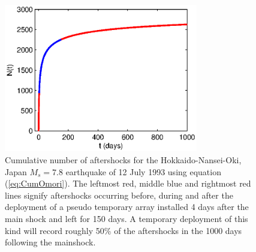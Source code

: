 \documentclass[extra, onecolumn, doublespacing]{gji}
\begin{document}
\begin{figure}
\noindent\includegraphics[width = 20pc]{Figure12_c.eps}
\caption{Cumulative number of aftershocks for the
Hokkaido-Nansei-Oki, Japan $M_s=7.8$ earthquake of 12 July 1993
using equation (\ref{eq:CumOmori}). The leftmost red, middle blue
and rightmost red lines signify aftershocks occurring before, during
and after the deployment of a pseudo temporary array installed 4
days after the main shock and left for 150 days. A temporary
deployment of this kind will record roughly 50\% of the aftershocks
in the 1000 days following the mainshock. } \label{fig:Omorifigure}
\end{figure}



\end{document}
